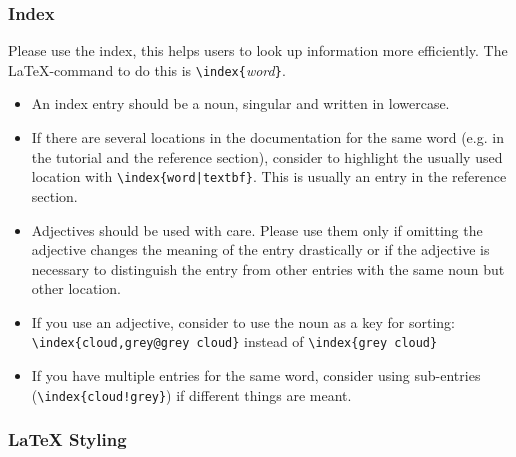 \subsubsection{Index}
Please use the index, this helps users to look up information more efficiently.
The \LaTeX-command to do this is \verb#\index{#\textit{word}\verb#}#.
\begin{itemize}
\item An index entry should be a noun, singular and written in lowercase.
\item If there are several locations in the documentation for the same word (e.g. in the tutorial and the
  reference section), consider to highlight the usually used location with \verb#\index{word|textbf}#.
  This is usually an entry in the reference section.
\item Adjectives should be used with care. 
  Please use them only if omitting the adjective changes the meaning of the entry drastically or
  if the adjective is necessary to distinguish the entry from other entries with the same noun but
  other location.
\item If you use an adjective, consider to use the noun as a key for sorting: \verb#\index{cloud,grey@grey cloud}#
  instead of \verb#\index{grey cloud}#
\item If you have multiple entries for the same word, consider using sub-entries (\verb#\index{cloud!grey}#)
  if different things are meant.
\end{itemize}

\subsubsection{\LaTeX{} Styling}

